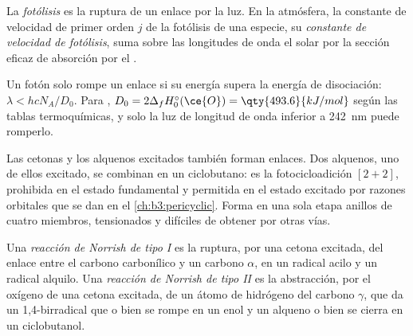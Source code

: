 \begin{definition}[Fotólisis]\label{def:b3:photochemistry:photolysis}
La \emph{fotólisis} es la ruptura de un enlace por la luz. En la
atmósfera, la constante de velocidad de primer orden $j$ de la fotólisis de una especie, su
\emph{constante de velocidad de fotólisis}, suma sobre
las longitudes de onda el  solar por la sección eficaz de absorción por el
.
\end{definition}

Un fotón solo rompe un enlace si su energía supera la energía de disociación:
$\lambda < hcN_A/D_0$. Para , $D_0 = 2\Delta_fH^\circ_0(\ce{O}) = \qty{493.6}{kJ/mol}$ según las tablas
termoquímicas, y solo la luz de longitud de onda inferior a \qty{242}{nm} puede romperlo.

Las cetonas y los alquenos excitados también forman enlaces. Dos alquenos, uno de ellos excitado,
se combinan en un ciclobutano: es la fotocicloadición $[2+2]$, prohibida en el
estado fundamental y permitida en el estado excitado por razones orbitales que se dan en el
\cref{ch:b3:pericyclic}. Forma en una sola etapa anillos de cuatro miembros, tensionados y difíciles
de obtener por otras vías.

\begin{definition}\label{def:b3:photochemistry:norrish}
Una \emph{reacción de Norrish de tipo I} es la ruptura, por
una cetona excitada, del enlace entre el carbono carbonílico y un carbono $\alpha$,
en un radical acilo y un radical alquilo. Una \emph{reacción de Norrish de tipo
II} es la abstracción, por el oxígeno de una
cetona excitada, de un átomo de hidrógeno del carbono $\gamma$, que da un 1,4-birradical
que o bien se rompe en un enol y un alqueno o bien se cierra en un ciclobutanol.
\end{definition}

